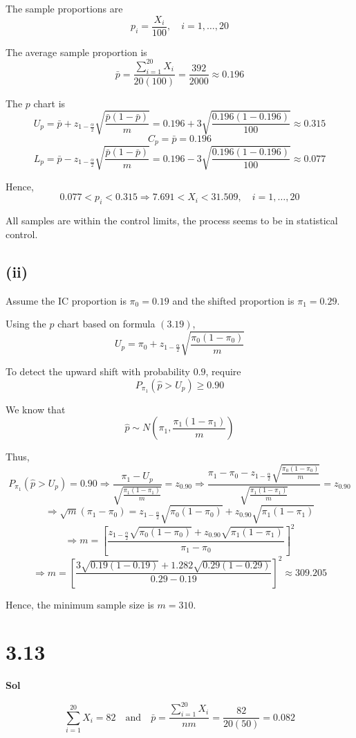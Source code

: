 \documentclass[a4paper, 12pt]{article}  %
\begin{document}
The sample proportions are
$$
p_i=\frac{X_i}{100},\quad i=1,\ldots,20
$$

The average sample proportion is
$$
\bar p=\frac{\sum_{i=1}^{20}X_i}{20(100)}=\frac{392}{2000}\approx0.196
$$

The \(p\) chart is
$$
U_p=\bar p+z_{1-\frac{\alpha}{2}}\sqrt{\frac{\bar p(1-\bar p)}{m}}=0.196+3\sqrt{\frac{0.196(1-0.196)}{100}}\approx0.315
$$
$$
C_p=\bar p=0.196
$$
$$
L_p=\bar p-z_{1-\frac{\alpha}{2}}\sqrt{\frac{\bar p(1-\bar p)}{m}}=0.196-3\sqrt{\frac{0.196(1-0.196)}{100}}\approx0.077
$$

Hence,
$$
0.077<p_i<0.315
\Rightarrow
7.691<X_i<31.509,\quad i=1,\ldots,20
$$

All samples are within the control limits, the process seems to be in statistical control.

\subsection*{(ii)}

Assume the IC proportion is $\pi_0=0.19$ and the shifted proportion is $\pi_1=0.29$.

Using the \(p\) chart based on formula \((3.19)\),
$$
U_p=\pi_0+z_{1-\frac{\alpha}{2}}\sqrt{\frac{\pi_0(1-\pi_0)}{m}}
$$

To detect the upward shift with probability \(0.9\), require
$$
P_{\pi_1}
\left(
\hat p>U_p
\right)
\ge 0.90
$$

We know that
$$
\hat p\sim N\left(\pi_1,\frac{\pi_1(1-\pi_1)}{m}\right)
$$

Thus,
$$
P_{\pi_1}\left(\hat p>U_p\right)=0.90
\Rightarrow \frac{\pi_1-U_p}{\sqrt{\frac{\pi_1(1-\pi_1)}{m}}}=z_{0.90}
\Rightarrow \frac{\pi_1-\pi_0-z_{1-\frac{\alpha}{2}}\sqrt{\frac{\pi_0(1-\pi_0)}{m}}}{\sqrt{\frac{\pi_1(1-\pi_1)}{m}}}=z_{0.90}
$$
$$
\Rightarrow \sqrt m(\pi_1-\pi_0)=z_{1-\frac{\alpha}{2}}\sqrt{\pi_0(1-\pi_0)}+z_{0.90}\sqrt{\pi_1(1-\pi_1)}
$$
$$
\Rightarrow m=\left[\frac{z_{1-\frac{\alpha}{2}}\sqrt{\pi_0(1-\pi_0)}+z_{0.90}\sqrt{\pi_1(1-\pi_1)}}{\pi_1-\pi_0}\right]^2
$$
$$
\Rightarrow m=\left[\frac{3\sqrt{0.19(1-0.19)}+1.282\sqrt{0.29(1-0.29)}}{0.29-0.19}\right]^2\approx 309.205
$$

Hence, the minimum sample size is $m=310$.

\section*{3.13}
\textbf{Sol}

$$
\sum_{i=1}^{20}X_i=82
\quad\text{and}\quad
\bar p=\frac{\sum_{i=1}^{20}X_i}{nm}=\frac{82}{20(50)}=0.082
$$
\end{document}
